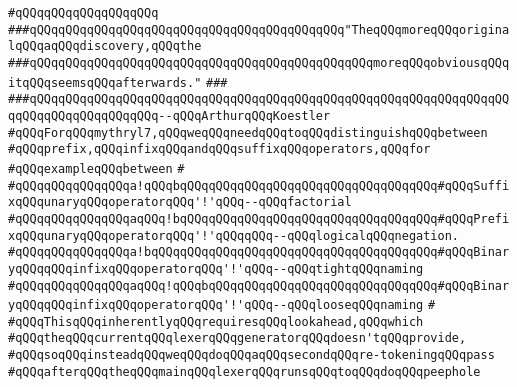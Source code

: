 \verb|#qQQqqQQqqQQqqQQqqQQq|\newline
\newline
\newline
\newline
\newline
\verb|###qQQqqQQqqQQqqQQqqQQqqQQqqQQqqQQqqQQqqQQqqQQq"TheqQQqmoreqQQqoriginalqQQqaqQQqdiscovery,qQQqthe|\newline
\verb|###qQQqqQQqqQQqqQQqqQQqqQQqqQQqqQQqqQQqqQQqqQQqqQQqmoreqQQqobviousqQQqitqQQqseemsqQQqafterwards."|\newline
\verb|###|\newline
\verb|###qQQqqQQqqQQqqQQqqQQqqQQqqQQqqQQqqQQqqQQqqQQqqQQqqQQqqQQqqQQqqQQqqQQqqQQqqQQqqQQqqQQqqQQq--qQQqArthurqQQqKoestler|\newline
\newline
\newline
\verb|#qQQqForqQQqmythryl7,qQQqweqQQqneedqQQqtoqQQqdistinguishqQQqbetween|\newline
\verb|#qQQqprefix,qQQqinfixqQQqandqQQqsuffixqQQqoperators,qQQqfor|\newline
\verb|#qQQqexampleqQQqbetween|\newline
\verb|#|\newline
\verb|#qQQqqQQqqQQqqQQqa!qQQqbqQQqqQQqqQQqqQQqqQQqqQQqqQQqqQQqqQQq#qQQqSuffixqQQqunaryqQQqoperatorqQQq'!'qQQq--qQQqfactorial|\newline
\verb|#qQQqqQQqqQQqqQQqaqQQq!bqQQqqQQqqQQqqQQqqQQqqQQqqQQqqQQqqQQq#qQQqPrefixqQQqunaryqQQqoperatorqQQq'!'qQQqqQQq--qQQqlogicalqQQqnegation.|\newline
\verb|#qQQqqQQqqQQqqQQqa!bqQQqqQQqqQQqqQQqqQQqqQQqqQQqqQQqqQQqqQQq#qQQqBinaryqQQqqQQqinfixqQQqoperatorqQQq'!'qQQq--qQQqtightqQQqnaming|\newline
\verb|#qQQqqQQqqQQqqQQqaqQQq!qQQqbqQQqqQQqqQQqqQQqqQQqqQQqqQQqqQQq#qQQqBinaryqQQqqQQqinfixqQQqoperatorqQQq'!'qQQq--qQQqlooseqQQqnaming|\newline
\verb|#|\newline
\verb|#qQQqThisqQQqinherentlyqQQqrequiresqQQqlookahead,qQQqwhich|\newline
\verb|#qQQqtheqQQqcurrentqQQqlexerqQQqgeneratorqQQqdoesn'tqQQqprovide,|\newline
\verb|#qQQqsoqQQqinsteadqQQqweqQQqdoqQQqaqQQqsecondqQQqre-tokeningqQQqpass|\newline
\verb|#qQQqafterqQQqtheqQQqmainqQQqlexerqQQqrunsqQQqtoqQQqdoqQQqpeephole|\newline
